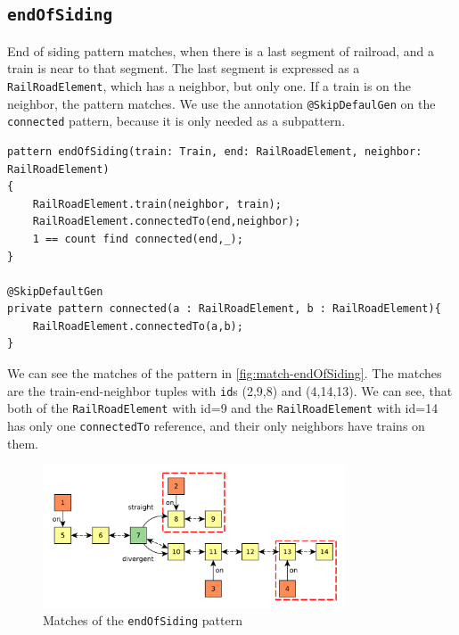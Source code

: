 \subsection{\texttt{endOfSiding}}

End of siding pattern matches, when there is a last segment of railroad, and a train is near to that segment.
The last segment is expressed as a \texttt{RailRoadElement}, which has a neighbor, but only one.
If a train is on the neighbor, the pattern matches.
We use the annotation \texttt{@SkipDefaulGen} on the \texttt{connected} pattern, because it is only needed as a subpattern.

\begin{minipage}{\textwidth}
\begin{lstlisting}[language = vql]
pattern endOfSiding(train: Train, end: RailRoadElement, neighbor: RailRoadElement)
{
	RailRoadElement.train(neighbor, train);		
	RailRoadElement.connectedTo(end,neighbor);
	1 == count find connected(end,_);	
}

@SkipDefaultGen
private pattern connected(a : RailRoadElement, b : RailRoadElement){
	RailRoadElement.connectedTo(a,b);
}
\end{lstlisting}

\end{minipage}

We can see the matches of the pattern in \autoref{fig:match-endOfSiding}. 
The matches are the train-end-neighbor tuples with \texttt{id}s (2,9,8) and (4,14,13). 
We can see, that both of the \texttt{RailRoadElement} with id=9 and the \texttt{RailRoadElement} with id=14 has only one \texttt{connectedTo} reference, and their only neighbors have trains on them.

\begin{figure}[H]
	\begin{center}
		\includegraphics[width=0.8\textwidth]{figures/query-example-model-endofsiding.pdf}
	\end{center}
	\caption{Matches of the \texttt{endOfSiding} pattern}
	\label{fig:match-endOfSiding}
\end{figure}



